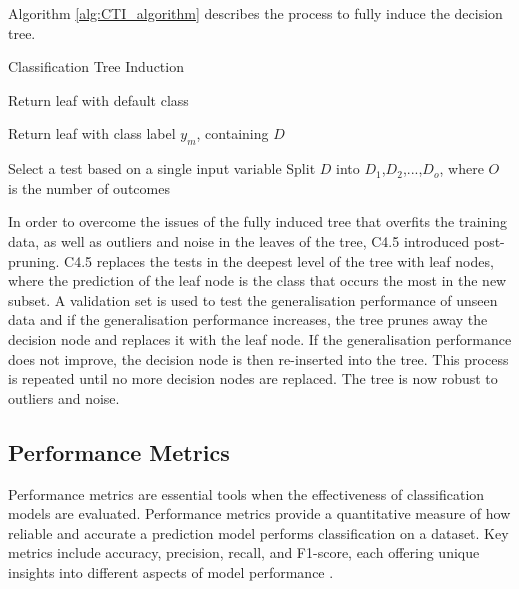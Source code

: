 \documentclass[10pt, conference]{IEEEtran}
\begin{document}
Algorithm \ref{alg:CTI_algorithm} describes the process to fully induce the decision tree. 
\begin{algorithm}
    \caption{Classification Tree Induction}
    \label{alg:CTI_algorithm}
    \begin{algorithmic}[1]
                \State Return leaf with default class
            \EndIf
            
                \State Return leaf with class label $y_m$, containing $D$
            \EndIf{}

            \State Select a test based on a single input variable
            \State Split $D$ into $D_1$,$D_2$,...,$D_o$, where $O$ is the number of outcomes
                \State {}
            \EndFor
        \EndFunction
    \end{algorithmic}
\end{algorithm}

In order to overcome the issues of the fully induced tree that overfits the training data, as well as outliers and
noise in the leaves of the tree, C4.5 introduced post-pruning. C4.5 replaces the tests in the deepest level
of the tree with leaf nodes, where the prediction of the leaf node is the class that occurs the most in the new subset.
A validation set is used to test the generalisation performance of unseen data and if the generalisation performance
increases, the tree prunes away the decision node and replaces it with the leaf node. If the generalisation performance
does not improve, the decision node is then re-inserted into the tree. This process is repeated until no more decision
nodes are replaced. The tree is now robust to outliers and noise.

\subsection{Performance Metrics} \label{performance_metric_background}

Performance metrics are essential tools when the effectiveness of classification models are evaluated. Performance metrics
provide a quantitative measure of how reliable and accurate a prediction model performs classification on a dataset.
Key metrics include accuracy, precision, recall, and F1-score, each offering unique insights into different aspects
of model performance \cite{Performance_ref}.
\end{document}
